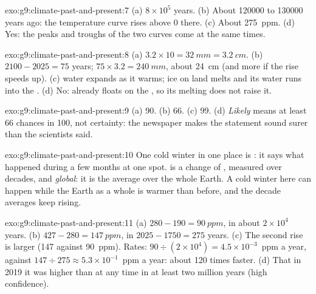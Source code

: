 \begin{solution}{exo:g9:climate-past-and-present:7}
(a) $8 \times 10^5$ years. (b) About \num{120000} to \num{130000} years
ago: the temperature curve rises above 0 there. (c) About \qty{275}{ppm}.
(d) Yes: the peaks and troughs of the two curves come at the same times.
\end{solution}

\begin{solution}{exo:g9:climate-past-and-present:8}
(a) $3.2 \times 10 = \qty{32}{mm} = \qty{3.2}{cm}$. (b) $2100 - 2025 =
75$ years; $75 \times 3.2 = \qty{240}{mm}$, about \qty{24}{cm} (and
more if the rise speeds up). (c)  water expands as it warms; ice on
land melts and its water runs into the . (d) No:  already
floats on the , so its melting does not raise it.
\end{solution}

\begin{solution}{exo:g9:climate-past-and-present:9}
(a) 90. (b) 66. (c) 99. (d) \emph{Likely} means at least 66 chances in
100, not certainty: the newspaper makes the statement sound surer than the
scientists said.
\end{solution}

\begin{solution}{exo:g9:climate-past-and-present:10}
One cold winter in one place is \emph{}: it says what happened
during a few months at one spot.  is a change of
\emph{}, measured over decades, and \emph{global}: it is the
average over the whole Earth. A cold winter here can happen while the
Earth as a whole is warmer than before, and the decade averages keep
rising.
\end{solution}

\begin{solution}{exo:g9:climate-past-and-present:11}
(a) $280 - 190 = \qty{90}{ppm}$, in about $2 \times 10^4$ years. (b) $427
- 280 = \qty{147}{ppm}$, in $2025 - 1750 = 275$ years. (c) The second
rise is larger (147 against 90~ppm). Rates: $90 \div (2 \times 10^4) =
4.5 \times 10^{-3}$~ppm a year, against $147 \div 275 \approx 5.3 \times
10^{-1}$~ppm a year: about 120 times faster. (d) That in 2019 it was
higher than at any time in at least two million years (high confidence).
\end{solution}

